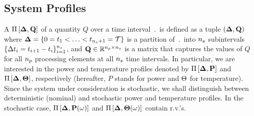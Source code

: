 \subsection{System Profiles} 
A  $\prof{\m{Q}}$ of a quantity $Q$ over a time interval $\period$ is defined as a tuple $(\part, \m{Q})$ where $\boldsymbol{\Delta} = \{ 0 = t_1 < \dotsc < t_{{n_s} + 1} = \mathcal{T} \}$ is a partition of $\period$ into ${n_s}$ subintervals $\{ \Delta t_i = t_{i+1} - t_i \}_{i = 1}^{{n_s}}$, and $\m{Q} \in \real^{\cores \times \steps}$ is a matrix that captures the values of $Q$ for all ${n_p}$ processing elements at all ${n_s}$ time intervals. In particular, we are interested in the power and temperature profiles denoted by $\prof{\mP}$ and $\Pi\left[\boldsymbol{\Delta}, {\boldsymbol\Theta}\right]$, respectively (hereafter, $P$ stands for power and $\Theta$ for temperature). Since the system under consideration is stochastic, we shall distinguish between deterministic (nominal) and stochastic power and temperature profiles. In the stochastic case, $\prof{\mP(\o)}$ and $\Pi\left[\boldsymbol{\Delta}, {\boldsymbol\Theta}(\omega)\right]$ contain r.v.'s.
